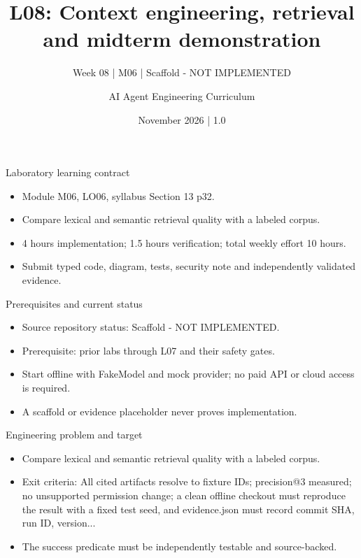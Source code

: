 \documentclass[aspectratio=169,10pt]{beamer}
\title[L08 - Agent Engineering]{L08: Context engineering, retrieval and midterm demonstration}
\subtitle{Week 08 | M06 | Scaffold - NOT IMPLEMENTED}
\author{AI Agent Engineering Curriculum}
\date{November 2026 | 1.0}
\begin{document}
\begin{frame}\titlepage\end{frame}

\begin{frame}{Laboratory learning contract}
\small
\begin{itemize}
\item Module M06, LO06, syllabus Section 13 p32.
\item Compare lexical and semantic retrieval quality with a labeled corpus.
\item 4 hours implementation; 1.5 hours verification; total weekly effort 10 hours.
\item Submit typed code, diagram, tests, security note and independently validated evidence.
\end{itemize}

\end{frame}

\begin{frame}{Prerequisites and current status}
\small
\begin{itemize}
\item Source repository status: Scaffold - NOT IMPLEMENTED.
\item Prerequisite: prior labs through L07 and their safety gates.
\item Start offline with FakeModel and mock provider; no paid API or cloud access is required.
\item A scaffold or evidence placeholder never proves implementation.
\end{itemize}

\end{frame}

\begin{frame}{Engineering problem and target}
\small
\begin{itemize}
\item Compare lexical and semantic retrieval quality with a labeled corpus.
\item Exit criteria: All cited artifacts resolve to fixture IDs; precision@3 measured; no unsupported permission change; a clean offline checkout must reproduce the result with a fixed test seed, and evidence.json must record commit SHA, run ID, version...
\item The success predicate must be independently testable and source-backed.
\end{itemize}

\end{frame}
\end{document}
